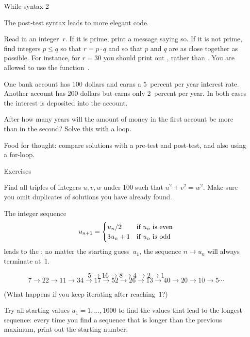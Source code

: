 \begin{block}{While syntax 2}
  \label{sl:while3}

  The post-test syntax leads to more elegant code.
\end{block}

\begin{exercise}
  \label{ex:squaregrid}
  Read in an integer~$r$. If it is prime, print a message saying so.
  If it is not prime, find integers $p\leq q$ so that $r=p\cdot q$ and so
  that $p$ and $q$ are as close together as possible.
  For instance, for $r=30$ you should print out , rather than
  . You are allowed to use the function~.
\end{exercise}

\begin{exercise}
  \label{ex:interest}
  One bank account has 100 dollars and earns a 5~percent per year interest
  rate. Another account has 200 dollars but earns only 2~percent per
  year. In both cases the interest is deposited into the account.
  
  After how many years will the amount of money in the first account
  be more than in the second? Solve this with a  loop.

  Food for thought: compare solutions with a pre-test and post-test,
  and also using a for-loop.
\end{exercise}

 {Exercises}

\begin{exercise}
  \label{ex:pythagoras}
  Find all triples of integers $u,v,w$ under 100 such that
  $u^2+v^2=w^2$. Make sure you omit duplicates of solutions you have
  already found.
\end{exercise}

\begin{exercise}
  \label{ex:collatz}
  The integer sequence
  \[ u_{n+1} = 
  \begin{cases}
    u_n/2&\hbox{if $u_n$ is even}\\
    3u_n+1&\hbox{if $u_n$ is odd}\\
  \end{cases}
  \]
  leads to the : no matter the starting guess~$u_1$,
  the sequence $n\mapsto u_n$ will always terminate at~1.

  { \small
  \[ 5\rightarrow 16\rightarrow 8\rightarrow 4\rightarrow 2\rightarrow 1\]
  \[ 7\rightarrow 22\rightarrow 11\rightarrow 34\rightarrow
  17\rightarrow 52\rightarrow 26\rightarrow 13\rightarrow
  40\rightarrow 20\rightarrow 10\rightarrow 5\cdots \]
  }

  (What happens if you keep iterating after reaching~1?)
  
  Try all starting values $u_1=1,\ldots,1000$ to find the values that
  lead to the longest sequence: every time you find a sequence that is
  longer than the previous maximum, print out the starting number.
\end{exercise}

